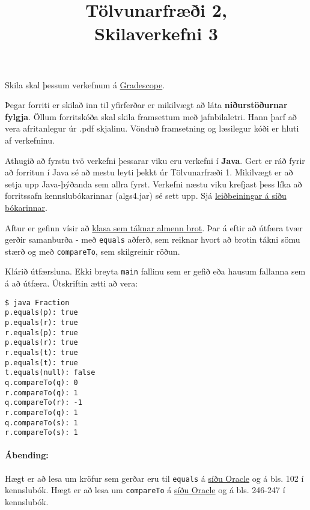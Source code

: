 \documentclass{article}
\title{Tölvunarfræði 2, \semester \\ Skilaverkefni 3}
\author{}
\begin{document}
\maketitle
{}

Skila skal þessum verkefnum á \href{https://gradescope.com/courses/14122}{Gradescope}.

Þegar forriti er skilað inn til yfirferðar er mikilvægt að láta \textbf{niðurstöðurnar fylgja}. Öllum forritskóða skal skila framsettum með jafnbilaletri. Hann þarf að vera afritanlegur úr .pdf skjalinu. Vönduð framsetning og læsilegur kóði er hluti af verkefninu.

Athugið að fyrstu tvö verkefni þessarar viku eru verkefni í \textbf{Java}. Gert er ráð fyrir að forritun í Java sé að mestu leyti þekkt úr Tölvunarfræði 1. Mikilvægt er að setja upp Java-þýðanda sem allra fyrst. Verkefni næstu viku krefjast þess líka að forritssafn kennslubókarinnar (algs4.jar) sé sett upp. Sjá \href{http://algs4.cs.princeton.edu/code/}{leiðbeiningar á síðu bókarinnar}.
\question

Aftur er gefinn vísir að \href{https://raw.githubusercontent.com/Ernir/kennsluefni/master/T2/Code/w4/Fraction.java}{klasa sem táknar almenn brot}. Þar á eftir að útfæra tvær gerðir samanburða - með \texttt{equals} aðferð, sem reiknar hvort að brotin tákni sömu stærð og með \texttt{compareTo}, sem skilgreinir röðun.

Klárið útfærsluna. Ekki breyta \texttt{main} fallinu sem er gefið eða hausum fallanna sem á að útfæra. Útskriftin ætti að vera:

\begin{verbatim}
$ java Fraction
p.equals(p): true
p.equals(r): true
r.equals(p): true
p.equals(r): true
r.equals(t): true
p.equals(t): true
t.equals(null): false
q.compareTo(q): 0
r.compareTo(q): 1
q.compareTo(r): -1
r.compareTo(q): 1
q.compareTo(s): 1
r.compareTo(s): 1
\end{verbatim}

\paragraph{Ábending:} Hægt er að lesa um kröfur sem gerðar eru til \texttt{equals} á \href{https://docs.oracle.com/javase/7/docs/api/java/lang/Object.html#equals(java.lang.Object)}{síðu Oracle} og á bls. 102 í kennslubók. Hægt er að lesa um \texttt{compareTo} á \href{https://docs.oracle.com/javase/8/docs/api/java/lang/Comparable.html}{síðu Oracle} og á bls. 246-247 í kennslubók.
\end{document}
